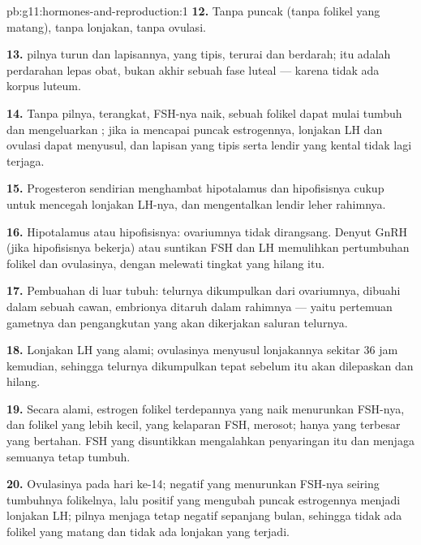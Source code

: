 \begin{solution}{pb:g11:hormones-and-reproduction:1}
\textbf{12.} Tanpa puncak (tanpa folikel yang matang), tanpa lonjakan,
tanpa ovulasi.

\textbf{13.}  pilnya turun dan lapisannya, yang tipis, terurai
dan berdarah; itu adalah perdarahan lepas obat, bukan akhir sebuah fase
luteal --- karena tidak ada korpus luteum.

\textbf{14.} Tanpa  pilnya,  terangkat, FSH-nya
naik, sebuah folikel dapat mulai tumbuh dan mengeluarkan ; jika
ia mencapai puncak estrogennya, lonjakan LH dan ovulasi dapat menyusul,
dan lapisan yang tipis serta lendir yang kental tidak lagi terjaga.

\textbf{15.} Progesteron sendirian menghambat hipotalamus dan
hipofisisnya cukup untuk mencegah lonjakan LH-nya, dan mengentalkan
lendir leher rahimnya.

\textbf{16.} Hipotalamus atau hipofisisnya: ovariumnya tidak
dirangsang. Denyut GnRH (jika hipofisisnya bekerja) atau suntikan FSH
dan LH memulihkan pertumbuhan folikel dan ovulasinya, dengan melewati
tingkat yang hilang itu.

\textbf{17.} Pembuahan di luar tubuh:  telurnya dikumpulkan dari
ovariumnya, dibuahi dalam sebuah cawan, embrionya ditaruh dalam
rahimnya --- yaitu pertemuan gametnya dan pengangkutan yang akan
dikerjakan saluran telurnya.

\textbf{18.} Lonjakan LH yang alami; ovulasinya menyusul lonjakannya
sekitar 36 jam kemudian, sehingga  telurnya dikumpulkan tepat
sebelum  itu akan dilepaskan dan hilang.

\textbf{19.} Secara alami, estrogen folikel terdepannya yang naik
menurunkan FSH-nya, dan folikel yang lebih kecil, yang kelaparan FSH,
merosot; hanya yang terbesar yang bertahan. FSH yang disuntikkan
mengalahkan penyaringan itu dan menjaga semuanya tetap tumbuh.

\textbf{20.} Ovulasinya pada hari ke-14;  negatif yang
menurunkan FSH-nya seiring tumbuhnya folikelnya, lalu 
positif yang mengubah puncak estrogennya menjadi lonjakan LH; pilnya
menjaga  tetap negatif sepanjang bulan, sehingga tidak
ada folikel yang matang dan tidak ada lonjakan yang terjadi.
\end{solution}
